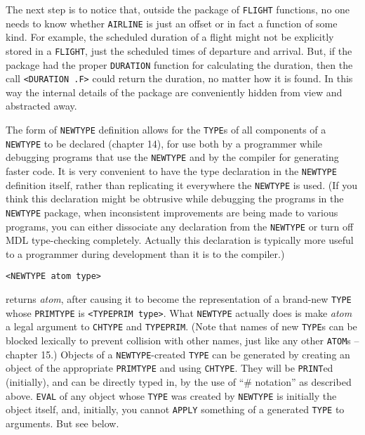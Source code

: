 \documentclass[a4paper]{scrbook}
\begin{document}
The next step is to notice that, outside the package of \texttt{FLIGHT} functions, no one needs to know whether
\texttt{AIRLINE} is just an offset or in fact a function of some kind. For example, the scheduled duration of a flight
might not be explicitly stored in a \texttt{FLIGHT}, just the scheduled times of departure and arrival. But, if the package
had the proper \texttt{DURATION} function for calculating the duration, then the call
\texttt{\textless{}DURATION\ .F\textgreater{}} could return the duration, no matter how it is found. In this way the
internal details of the package are conveniently hidden from view and abstracted away.

The form of \texttt{NEWTYPE} definition allows for the \texttt{TYPE}s of all components of a \texttt{NEWTYPE} to be
declared (chapter 14), for use both by a programmer while debugging programs that use the \texttt{NEWTYPE} and by the
compiler for generating faster code. It is very convenient to have the type declaration in the \texttt{NEWTYPE} definition
itself, rather than replicating it everywhere the \texttt{NEWTYPE} is used. (If you think this declaration might be
obtrusive while debugging the programs in the \texttt{NEWTYPE} package, when inconsistent improvements are being made to
various programs, you can either dissociate any declaration from the \texttt{NEWTYPE} or turn off MDL type-checking
completely. Actually this declaration is typically more useful to a programmer during development than it is to the
compiler.)

\begin{verbatim}
<NEWTYPE atom type>
\end{verbatim}

returns \emph{atom}, after causing it to become the representation of a brand-new \texttt{TYPE} whose \texttt{PRIMTYPE} is
\texttt{\textless{}TYPEPRIM\ type\textgreater{}}. What \texttt{NEWTYPE} actually does is make \emph{atom} a legal argument
to \texttt{CHTYPE} and \texttt{TYPEPRIM}. (Note that names of new \texttt{TYPE}s can be blocked lexically to prevent
collision with other names, just like any other \texttt{ATOM}s -- chapter 15.) Objects of a \texttt{NEWTYPE}-created
\texttt{TYPE} can be generated by creating an object of the appropriate \texttt{PRIMTYPE} and using \texttt{CHTYPE}. They
will be \texttt{PRINT}ed (initially), and can be directly typed in, by the use of ``\# notation'' as described above.
\texttt{EVAL} of any object whose \texttt{TYPE} was created by \texttt{NEWTYPE} is initially the object itself, and,
initially, you cannot \texttt{APPLY} something of a generated \texttt{TYPE} to arguments. But see below.
\end{document}

